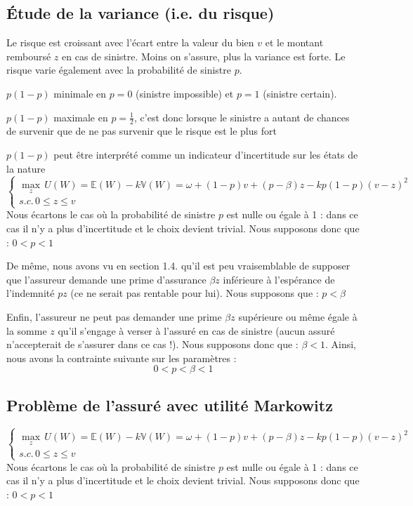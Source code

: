 \documentclass[a4paper, 12pt]{report}
\begin{document}
\subsection{Étude de la variance (i.e. du risque)}

Le risque est croissant avec l'écart entre la valeur du bien $v$ et le montant remboursé $z$ en cas de sinistre. Moins on s'assure, plus la variance est forte. Le risque varie également avec la probabilité de sinistre $p$.

$p(1-p)$ minimale en $p=0$ (sinistre impossible) et $p=1$ (sinistre certain). 

$p(1-p)$  maximale en $p=\frac{1}{2}$, c'est donc lorsque le sinistre a autant
de chances de survenir que de ne pas survenir que le risque est le
plus fort

$p(1-p)$  peut être interprété comme un indicateur d'incertitude sur les états de la nature
$$
\begin{cases}\underset{z}\max \,U(W)=\mathbb{E}(W)-k\mathbb{V}(W)=\omega+(1-p)v+(p-\beta)z-kp(1-p)(v-z)^2\\ s.c. \, 0\le z\le v\end{cases}
$$
Nous écartons le cas où la probabilité de sinistre $p$ est nulle ou égale à 1 : dans ce cas il n'y a plus d'incertitude et le choix devient trivial. Nous supposons donc que : $0<p<1$

De même, nous avons vu en section 1.4. qu'il est peu vraisemblable de supposer que l'assureur demande une prime d'assurance $\beta z$ inférieure à l'espérance de l'indemnité $pz$ (ce ne serait pas rentable pour lui). Nous supposons que : $p<\beta$

Enfin, l'assureur ne peut pas demander une prime $\beta z$ supérieure ou même égale à la somme $z$ qu'il s'engage à verser à l'assuré en cas de sinistre (aucun assuré n'accepterait de s'assurer dans ce cas !). Nous supposons donc que : $\beta<1$. Ainsi, nous avons la contrainte suivante sur les paramètres :
$$
0<p<\beta<1
$$


\subsection{Problème de l'assuré avec utilité Markowitz}
$$
\begin{cases}\underset{z}\max \,U(W)=\mathbb{E}(W)-k\mathbb{V}(W)=\omega+(1-p)v+(p-\beta)z-kp(1-p)(v-z)^2\\ s.c. \, 0\le z\le v\end{cases}
$$
Nous écartons le cas où la probabilité de sinistre $p$ est nulle ou égale à 1 : dans ce cas il n'y a plus d'incertitude et le choix devient trivial. Nous supposons donc que : $0<p<1$
\end{document}
